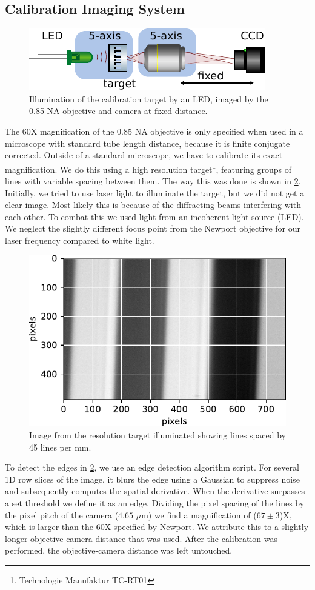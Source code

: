 \subsection{Calibration Imaging System}

\begin{figure}
    \centering
    \includegraphics[width = 0.5\linewidth]{figures/LEDcalibration.pdf}
    \caption{Illumination of the calibration target by an LED, imaged by the 0.85 NA objective and camera at fixed distance.}
    \label{fig:resolutionTarget}
\end{figure}

The 60X magnification of the 0.85 NA objective is only specified when used in a microscope with standard tube length distance, because it is finite conjugate corrected.
Outside of a standard microscope, we have to calibrate its exact magnification.
We do this using a high resolution target\footnote{Technologie Manufaktur TC-RT01}, featuring groups of lines with variable spacing between them. 
The way this was done is shown in \cref{fig:resolutionTarget}.
Initially, we tried to use laser light to illuminate the target, but we did not get a clear image. 
Most likely this is because of the diffracting beams interfering with each other. 
To combat this we used light from an incoherent light source (\ac{LED}). We neglect the slightly different focus point from the Newport objective for our laser frequency compared to white light. 

\begin{figure}
    \centering
    \includegraphics[width = 0.42\linewidth]{figures/LineSpacingCalibration.pdf}
    \caption{Image from the resolution target illuminated showing lines spaced by 45 lines per mm.}
    \label{fig:resolutionTarget}
\end{figure}

To detect the edges in \cref{fig:resolutionTarget}, we use an edge detection algorithm script.
For several 1D row slices of the image, it blurs the edge using a Gaussian to suppress noise and subsequently computes the spatial derivative. 
When the derivative surpasses a set threshold we define it as an edge.
Dividing the pixel spacing of the lines by the pixel pitch of the camera ($4.65$ $\mu$m) we find a magnification of ($67 \pm 3$)X, which is larger than the 60X specified by Newport. 
We attribute this to a slightly longer objective-camera distance that was used. 
After the calibration was performed, the objective-camera distance was left untouched. 

